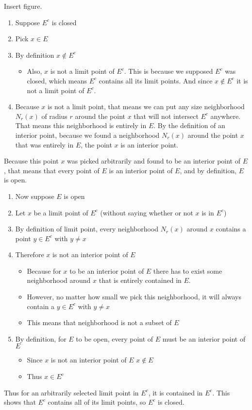 \begin{proof-dan}
  Insert figure.
  \begin{enumerate}
    \item{Suppose $E^{c}$ is closed}
    \item{Pick $x\in E$}
    \item{By definition $x\notin E^{c}$}
    \begin{itemize}
      \item{%
        Also, $x$ is not a limit point of $E^{c}$.
        This is because we supposed $E^{c}$ was closed, which means $E^{c}$ contains all its limit points.
        And since $x\notin E^{c}$ it is not a limit point of $E^{c}$.
      }
    \end{itemize}
    \item{%
      Because $x$ is not a limit point, that means we can put any size neighborhood $N_{r}(x)$ of radius $r$ around the point $x$ that will not intersect $E^{c}$ anywhere.
      That means this neighborhood is entirely in $E$.
      By the definition of an interior point, because we found a neighborhood $N_{r}(x)$ around the point $x$ that was entirely in $E$, the point $x$ is an interior point.
    }
  \end{enumerate}
  Because this point $x$ was picked arbitrarily and found to be an interior point of $E$, that means that every point of $E$ is an interior point of $E$, and by definition, $E$ is open.
  \begin{enumerate}
    \item{Now suppose $E$ is open}
    \item{Let $x$ be a limit point of $E^{c}$ (without saying whether or not $x$ is in $E^{c}$)}
    \item{By definition of limit point, every neighborhood $N_{r}(x)$ around $x$ contains a point $y\in E^{c}$ with $y\neq x$}
    \item{Therefore $x$ is not an interior point of $E$}
    \begin{itemize}
      \item{Because for $x$ to be an interior point of $E$ there has to exist some neighborhood around $x$ that is entirely contained in $E$.}
      \item{However, no matter how small we pick this neighborhood, it will always contain a $y\in E^{c}$ with $y\neq x$}
      \item{This means that neighborhood is not a subset of $E$}
    \end{itemize}
    \item{By definition, for $E$ to be open, every point of $E$ must be an interior point of $E$}
    \begin{itemize}
      \item{Since $x$ is not an interior point of $E$ $x\notin E$}
      \item{Thus $x\in E^{c}$}
    \end{itemize}
  \end{enumerate}
  Thus for an arbitrarily selected limit point in $E^{c}$, it is contained in $E^{c}$.
  This shows that $E^{c}$ contains all of its limit points, so $E^{c}$ is closed.
\end{proof-dan}

